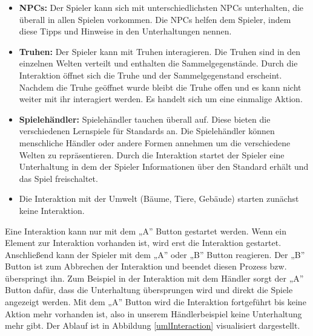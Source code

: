 			\begin{itemize}
				\item {\textbf{\acp{NPC}:} Der Spieler kann sich mit unterschiedlichsten \acp{NPC} unterhalten, die überall in allen Spielen vorkommen. Die \acp{NPC} helfen dem Spieler, indem diese Tipps und Hinweise in den Unterhaltungen nennen.}
				\item {\textbf{Truhen:} Der Spieler kann mit Truhen interagieren. Die Truhen sind in den einzelnen Welten verteilt und enthalten die Sammelgegenstände. Durch die Interaktion öffnet sich die Truhe und der Sammelgegenstand erscheint. Nachdem die Truhe geöffnet wurde bleibt die Truhe offen und es kann nicht weiter mit ihr interagiert werden. Es handelt sich um eine einmalige Aktion.}
				\item {\textbf{Spielehändler:} Spielehändler tauchen überall auf. Diese bieten die verschiedenen Lernspiele für Standards an. Die Spielehändler können menschliche Händler oder andere Formen annehmen um die verschiedene Welten zu repräsentieren. Durch die Interaktion startet der Spieler eine Unterhaltung in dem der Spieler Informationen über den Standard erhält und das Spiel freischaltet.}
				\item {Die Interaktion mit der Umwelt (Bäume, Tiere, Gebäude) starten zunächst keine Interaktion.}
			\end{itemize}
			
			Eine Interaktion kann nur mit dem „A” Button gestartet werden. Wenn ein Element zur Interaktion vorhanden ist, wird erst die Interaktion gestartet. Anschließend kann der Spieler mit dem „A” oder „B” Button reagieren. Der „B” Button ist zum Abbrechen der Interaktion und beendet diesen Prozess bzw. überspringt ihn. Zum Beispiel in der Interaktion mit dem Händler sorgt der „A” Button dafür, dass die Unterhaltung übersprungen wird und direkt die Spiele angezeigt werden. Mit dem „A” Button wird die Interaktion fortgeführt bis keine Aktion mehr vorhanden ist, also in unserem Händlerbeispiel keine Unterhaltung mehr gibt. Der Ablauf ist in Abbildung \ref{umlInteraction} visualisiert dargestellt.
			
